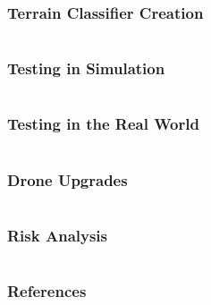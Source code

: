 \documentclass[aspectratio=169]{rubeamer}
\begin{document}
\begin{frame}
  \frametitle{Terrain Classifier Creation}
  \begin{columns}
    \centering
  \end{columns}
\end{frame}

\begin{frame}
  \frametitle{Testing in Simulation}
  \begin{columns}
    \centering
  \end{columns}
\end{frame}

\begin{frame}
  \frametitle{Testing in the Real World}
  \begin{columns}
    \centering
  \end{columns}
\end{frame}

\begin{frame}
  \frametitle{Drone Upgrades}
  \begin{columns}
    \centering
  \end{columns}
\end{frame}

\begin{frame}
  \frametitle{Risk Analysis}
  \begin{columns}
    \centering
  \end{columns}
\end{frame}

\begin{frame}[allowframebreaks]
  \frametitle{References}
  \printbibliography{}
\end{frame}
\end{document}
